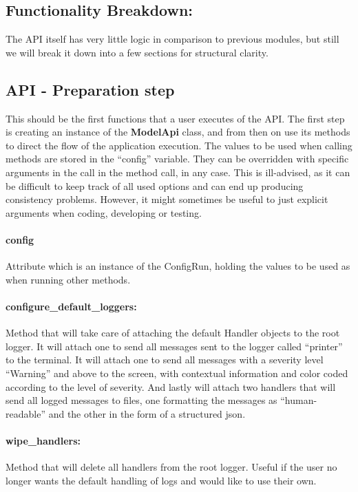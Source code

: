 \documentclass[a4paper, 11pt]{report}
\begin{document}
   \subsection{Functionality Breakdown:}
   The API itself has very little logic in comparison to previous modules, but still we will break it down into a few sections for structural clarity.
   \subsection{API - Preparation step}
   This should be the first functions that a user executes of the API. The first step is creating an instance of the \textbf{ModelApi} class, and from then on use its methods to direct the flow of the application execution. The values to be used when calling methods are stored in the ``config'' variable. They can be overridden with specific arguments in the call in the method call, in any case. This is ill-advised, as it can be difficult to keep track of all used options and can end up producing consistency problems. However, it might sometimes be useful to just explicit arguments when coding, developing or testing.

   \paragraph{config} Attribute which is an instance of the ConfigRun, holding the values to be used as when running other methods.

   \paragraph{configure\_default\_loggers:} Method that will take care of attaching the default Handler objects to the root logger. It will attach one to send all messages sent to the logger called ``printer'' to the terminal. It will attach one to send all messages with a severity level ``Warning'' and above to the screen, with contextual information and color coded according to the level of severity. And lastly will attach two handlers that will send all logged messages to files, one formatting the messages as ``human-readable'' and the other in the form of a structured json.

   \paragraph{wipe\_handlers:} Method that will delete all handlers from the root logger. Useful if the user no longer wants the default handling of logs and would like to use their own.
\end{document}
